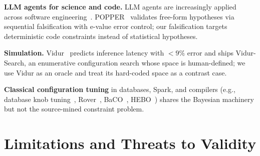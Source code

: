 \documentclass[journal]{IEEEtran}
\begin{document}
\textbf{LLM agents for science and code.} LLM agents are increasingly applied across software engineering~\cite{llm4sesurvey}. POPPER~\cite{ref8} validates free-form hypotheses via sequential falsification with e-value error control; our falsification targets deterministic code constraints instead of statistical hypotheses.

\textbf{Simulation.} Vidur~\cite{ref6} predicts inference latency with ${<}9\%$ error and ships Vidur-Search, an enumerative configuration search whose space is human-defined; we use Vidur as an oracle and treat its hard-coded space as a contrast case.

\textbf{Classical configuration tuning} in databases, Spark, and compilers (e.g., database knob tuning~\cite{ituned,ottertune,llamatune}, Rover~\cite{ref10}, BaCO~\cite{ref11}, HEBO~\cite{ref12}) shares the Bayesian machinery but not the source-mined constraint problem.

\section{Limitations and Threats to Validity}
\label{sec:limitations}
\end{document}
